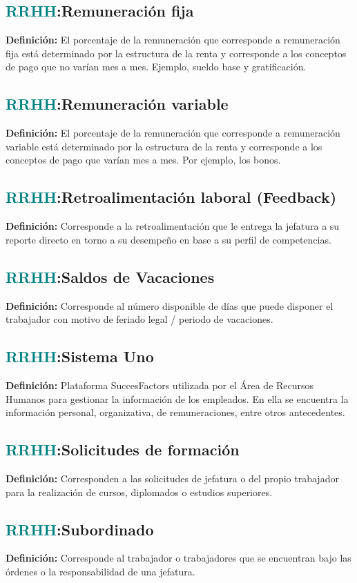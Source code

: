 \documentclass[12pt]{article}
\begin{document}
\subsection{\textcolor{teal}{RRHH}:{Remuneración fija}}
\textbf{Definición:} El porcentaje de la remuneración que corresponde a remuneración fija está determinado por la estructura de la renta y corresponde a los conceptos de pago que no varían mes a mes. Ejemplo, sueldo base y gratificación.
\subsection{\textcolor{teal}{RRHH}:{Remuneración variable}}
\textbf{Definición:} El porcentaje de la remuneración que corresponde a remuneración variable está determinado por la estructura de la renta y corresponde a los conceptos de pago que varían mes a mes. Por ejemplo, los bonos.
\subsection{\textcolor{teal}{RRHH}:{Retroalimentación laboral (Feedback)}}
\textbf{Definición:} Corresponde a la retroalimentación que le entrega la jefatura a su reporte directo en torno a su desempeño en base a su perfil de competencias.
\subsection{\textcolor{teal}{RRHH}:{Saldos de Vacaciones}}
\textbf{Definición:} Corresponde al número disponible de días que puede disponer el trabajador con motivo de feriado legal / periodo de vacaciones.
\subsection{\textcolor{teal}{RRHH}:{Sistema Uno}}
\textbf{Definición:} Plataforma SuccesFactors utilizada por el Área de Recursos Humanos para gestionar la información de los empleados. En ella se encuentra la información personal, organizativa, de remuneraciones, entre otros antecedentes.
\subsection{\textcolor{teal}{RRHH}:{Solicitudes de formación}}
\textbf{Definición:} Corresponden a las solicitudes de jefatura o del propio trabajador para la realización de cursos, diplomados o estudios superiores.
\subsection{\textcolor{teal}{RRHH}:{Subordinado}}
\textbf{Definición:} Corresponde al trabajador o trabajadores que se encuentran bajo las órdenes o la responsabilidad de una jefatura.
\end{document}
